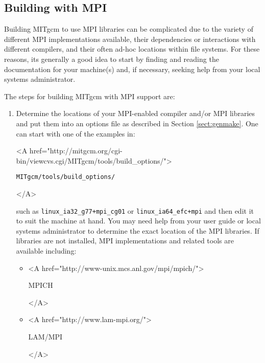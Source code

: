 \subsection{Building with MPI}
\label{sect:mpi-build}

Building MITgcm to use MPI libraries can be complicated due to the
variety of different MPI implementations available, their dependencies
or interactions with different compilers, and their often ad-hoc
locations within file systems.  For these reasons, its generally a
good idea to start by finding and reading the documentation for your
machine(s) and, if necessary, seeking help from your local systems
administrator.

The steps for building MITgcm with MPI support are:
\begin{enumerate}
  
\item Determine the locations of your MPI-enabled compiler and/or MPI
  libraries and put them into an options file as described in Section
  \ref{sect:genmake}.  One can start with one of the examples in:
  \begin{rawhtml} <A
    href="http://mitgcm.org/cgi-bin/viewcvs.cgi/MITgcm/tools/build_options/">
  \end{rawhtml}
  \begin{center}
    \texttt{MITgcm/tools/build\_options/}
  \end{center}
  \begin{rawhtml} </A> \end{rawhtml}
  such as \texttt{linux\_ia32\_g77+mpi\_cg01} or
  \texttt{linux\_ia64\_efc+mpi} and then edit it to suit the machine at
  hand.  You may need help from your user guide or local systems
  administrator to determine the exact location of the MPI libraries.
  If libraries are not installed, MPI implementations and related
  tools are available including:
  \begin{itemize}
  \item \begin{rawhtml} <A
      href="http://www-unix.mcs.anl.gov/mpi/mpich/">
    \end{rawhtml}
    MPICH
    \begin{rawhtml} </A> \end{rawhtml}

  \item \begin{rawhtml} <A
      href="http://www.lam-mpi.org/">
    \end{rawhtml}
    LAM/MPI
    \begin{rawhtml} </A> \end{rawhtml}


\end{itemize}
\end{enumerate}
